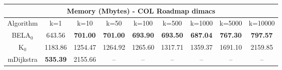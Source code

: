 \begin{tabular}{c|cccccccc}\toprule
\multicolumn{9}{c}{Memory (Mbytes) - COL Roadmap dimacs}\\ \midrule
Algorithm & k=1 & k=10 & k=50 & k=100 & k=500 & k=1000 & k=5000 & k=10000 \\ \midrule
BELA$_0$ & 643.56 & \textbf{701.00} & \textbf{701.00} & \textbf{693.90} & \textbf{693.50} & \textbf{687.04} & \textbf{767.30} & \textbf{797.57} \\
K$_0$ & 1183.86 & 1254.47 & 1264.92 & 1265.60 & 1317.71 & 1359.37 & 1691.10 & 2159.85 \\
mDijkstra & \textbf{535.39} & 2155.66 & -- & -- & -- & -- & -- & -- \\ \bottomrule 
\end{tabular}
